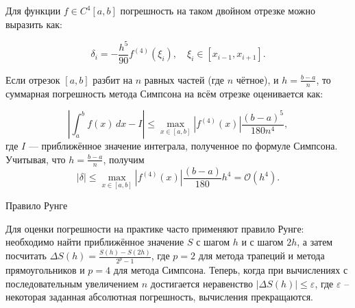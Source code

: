 \documentclass[a4paper, 14pt]{extarticle}
\begin{document}
\begin{justify}
Для функции $f \in C^4[a, b]$ погрешность на таком двойном отрезке можно выразить как:

\[
\delta_i = -\frac{h^5}{90} f^{(4)}(\xi_i), \quad \xi_i \in [x_{i-1}, x_{i+1}].
\]

Если отрезок $[a, b]$ разбит на $n$ равных частей (где $n$ чётное), и $h = \frac{b - a}{n}$, то суммарная погрешность метода Симпсона на всём отрезке оценивается как:

\[
\left| \int_a^b f(x)\, dx - I \right| \leq \max_{x \in [a, b]} \left| f^{(4)}(x) \right| \frac{(b - a)^5}{180 n^4},
\]
где $I$ — приближённое значение интеграла, полученное по формуле Симпсона. Учитывая, что $h = \frac{b - a}{n}$, получим
\[
|\delta| \leq \max_{x \in [a, b]} \left| f^{(4)}(x) \right| \frac{(b - a)}{180}h^4 = \mathcal{O}(h^4).
\]

\noindent\large {Правило Рунге}\\ \normalsize

Для оценки погрешности на практике часто применяют правило Рунге: необходимо найти приближённое значение $S$ с шагом 
$h$ и с шагом $2h$, а затем посчитать $\Delta S(h) = \frac{S(h) - S(2h)}{2^p - 1}$, где $p = 2$ для метода трапеций и 
метода прямоугольников и $p = 4$ для метода Симпсона. Теперь, когда при вычислениях с последовательным 
увеличением $n$ достигается неравенство $|\Delta S(h)| \le \varepsilon$, где $\varepsilon$ -- некоторая 
заданная абсолютная погрешность, вычисления прекращаются.

\end{justify}
\pagebreak
\end{document}
